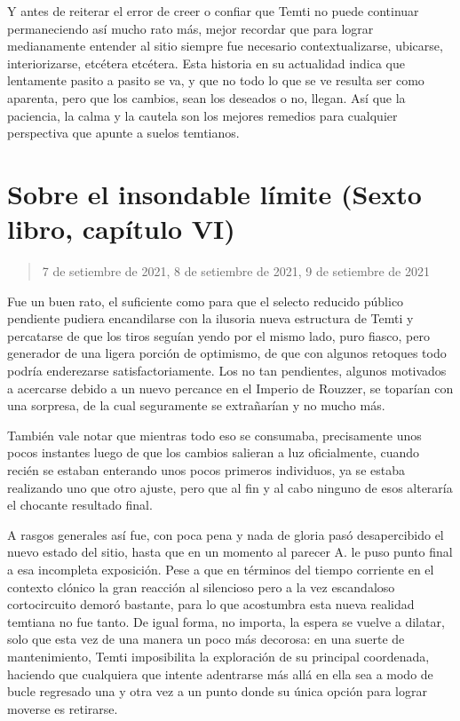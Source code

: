 \documentclass[
]{book}
\begin{document}
Y antes de reiterar el error de creer o confiar que Temti no puede continuar permaneciendo así mucho rato más, mejor recordar que para lograr medianamente entender al sitio siempre fue necesario contextualizarse, ubicarse, interiorizarse, etcétera etcétera. Esta historia en su actualidad indica que lentamente pasito a pasito se va, y que no todo lo que se ve resulta ser como aparenta, pero que los cambios, sean los deseados o no, llegan. Así que la paciencia, la calma y la cautela son los mejores remedios para cualquier perspectiva que apunte a suelos temtianos.

\hypertarget{sobre-el-insondable-luxedmite-sexto-libro-capuxedtulo-vi}{%
\section{Sobre el insondable límite (Sexto libro, capítulo VI)}\label{sobre-el-insondable-luxedmite-sexto-libro-capuxedtulo-vi}}

\begin{quote}
7 de setiembre de 2021, 8 de setiembre de 2021, 9 de setiembre de 2021
\end{quote}

Fue un buen rato, el suficiente como para que el selecto reducido público pendiente pudiera encandilarse con la ilusoria nueva estructura de Temti y percatarse de que los tiros seguían yendo por el mismo lado, puro fiasco, pero generador de una ligera porción de optimismo, de que con algunos retoques todo podría enderezarse satisfactoriamente. Los no tan pendientes, algunos motivados a acercarse debido a un nuevo percance en el Imperio de Rouzzer, se toparían con una sorpresa, de la cual seguramente se extrañarían y no mucho más.

También vale notar que mientras todo eso se consumaba, precisamente unos pocos instantes luego de que los cambios salieran a luz oficialmente, cuando recién se estaban enterando unos pocos primeros individuos, ya se estaba realizando uno que otro ajuste, pero que al fin y al cabo ninguno de esos alteraría el chocante resultado final.

A rasgos generales así fue, con poca pena y nada de gloria pasó desapercibido el nuevo estado del sitio, hasta que en un momento al parecer A. le puso punto final a esa incompleta exposición. Pese a que en términos del tiempo corriente en el contexto clónico la gran reacción al silencioso pero a la vez escandaloso cortocircuito demoró bastante, para lo que acostumbra esta nueva realidad temtiana no fue tanto. De igual forma, no importa, la espera se vuelve a dilatar, solo que esta vez de una manera un poco más decorosa: en una suerte de mantenimiento, Temti imposibilita la exploración de su principal coordenada, haciendo que cualquiera que intente adentrarse más allá en ella sea a modo de bucle regresado una y otra vez a un punto donde su única opción para lograr moverse es retirarse.
\end{document}
